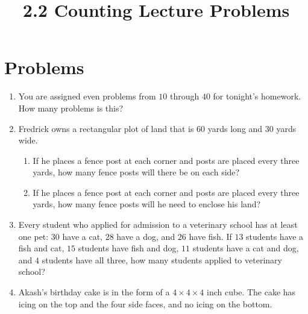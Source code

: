 \documentclass{article}
\title{2.2 Counting Lecture Problems}
\author{}
\date{}
\begin{document}
\maketitle
\section*{Problems}

\begin{enumerate}
	\item You are assigned even problems from $10$ through $40$ for tonight's 
		homework. How many problems is this?
		\vspace{3cm}
    \item Fredrick owns a rectangular plot of land that is $60$ yards long and 
    $30$ yards wide.
    \begin{enumerate}
        \item If he places a fence post at each corner and posts are placed 
            every three yards, how many fence posts will there be on each 
            side?
            \vspace{3cm}
        \item If he places a fence post at each corner and posts are placed 
            every three yards, how many fence posts will he need to enclose 
            his land?
            \vspace{3cm}
    \end{enumerate}
    \item Every student who applied for admission to a veterinary school has 
    at least one pet: $30$ have a cat, $28$ have a dog, and $26$ have 
    fish. If $13$ students have a fish and cat, $15$ students have 
    fish and dog, $11$ students have a cat and dog, and $4$ 
    students have all three, how many students applied to 
    veterinary school? 
    \begin{center}
    \end{center}
    \vspace{3cm}
    \item Akash's birthday cake is in the form of a $4 \times 4 \times 4$ inch cube.
        The cake has icing on the top and the four side faces, and no icing on the bottom.

\end{enumerate}
\end{document}
